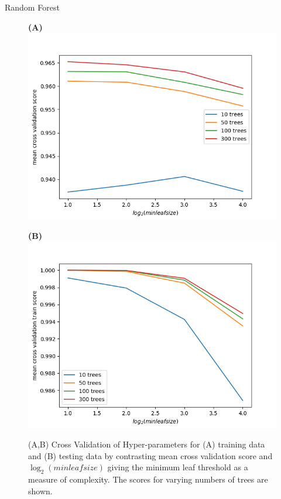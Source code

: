 \documentclass[titlepage,leqno]{beamer}%
\begin{document}
\begin{frame}{Random Forest}

\begin{figure}[h]
    \centering
    \begin{minipage}[t]{0.45\textwidth}
        \centering
        \textbf{(A)}
        \includegraphics[width=\textwidth]{CVscoreVsLeafSize.png}
    \end{minipage}
    \begin{minipage}[t]{0.45\textwidth}
        \centering
        \textbf{(B)}
        \includegraphics[width=\textwidth]{CVtestVsLeafSize.png}
    \end{minipage}
\caption{\footnotesize
(A,B) Cross Validation of Hyper-parameters for (A) training data and (B) testing data by contrasting mean cross validation score and $\log_2(minleafsize)$ giving the minimum leaf threshold as a measure of complexity. The scores for varying numbers of trees are shown.}
\end{figure}

\end{frame}
\end{document}
